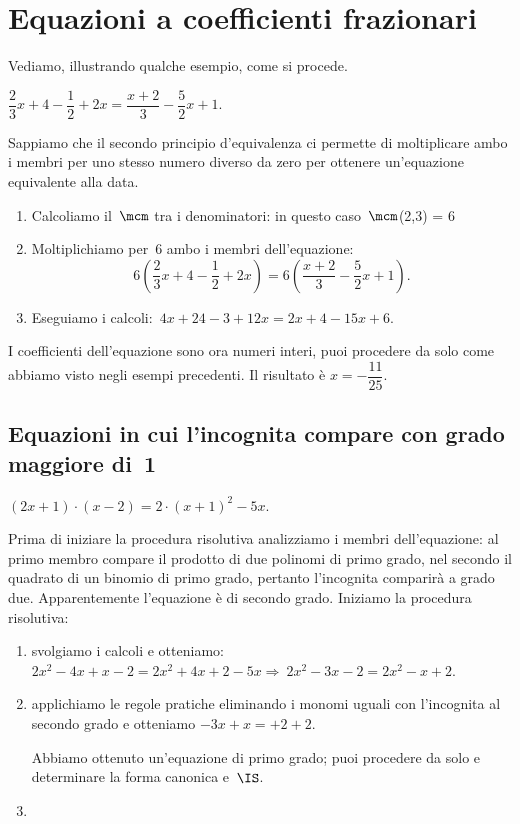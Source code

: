 \section{Equazioni a coefficienti frazionari}
\label{sec:13_coefffraz}

Vediamo, illustrando qualche esempio, come si procede.

 \begin{esempio}
\(\dfrac{2}{3}x+4-\dfrac{1}{2}+2x=\dfrac{x+2}{3}-\dfrac{5}{2}x+1\).

Sappiamo che il secondo principio d'equivalenza ci
permette di moltiplicare ambo i membri per uno stesso numero diverso da
zero per ottenere un'equazione equivalente alla data.

\begin{enumerate}
 \item Calcoliamo il~\(\mcm\) tra i denominatori: in questo
caso~\(\mcm\)(2,3) = 6
 \item Moltiplichiamo per~6 ambo i membri
dell'equazione:
\[6\left(\dfrac{2}{3}x+4-\dfrac{1}{2}+2x\right)=6\left(\dfrac{x+2}{3}-\dfrac{5}{
2}x+1\right).\]
 \item Eseguiamo i calcoli:~\(4x+24-3+12x=2x+4-15x+6\).
\end{enumerate}

I coefficienti dell'equazione sono ora numeri interi,
puoi procedere da solo come abbiamo visto negli esempi precedenti. Il risultato 
è \(x=-\dfrac{11}{25}\).
\end{esempio}


\subsection{Equazioni in cui l'incognita compare con grado maggiore di~1}

 \begin{esempio}

\((2x+1)\cdot (x-2)=2\cdot (x+1)^{2}-5x\).

Prima di iniziare la procedura risolutiva analizziamo i membri
dell'equazione: al primo membro compare il prodotto
di due polinomi di primo grado, nel secondo il quadrato di un binomio
di primo grado, pertanto l'incognita comparirà a grado due. Apparentemente
l'equazione è di secondo grado. Iniziamo la procedura
risolutiva:

\begin{enumerate}
 \item svolgiamo i calcoli e otteniamo:
\(2x^{2}-4x+x-2=2x^{2}+4x+2-5x\Rightarrow~2x^{2}-3x-2=2x^{2}-x+2.\)
 \item applichiamo le regole pratiche eliminando i monomi
uguali con l'incognita al secondo grado e otteniamo
\(-3x+x=+2+2\).

Abbiamo ottenuto un'equazione di primo grado; puoi
procedere da solo e determinare la forma canonica e~\(\IS\).
 \item \dotfill
\end{enumerate}

 \end{esempio}

